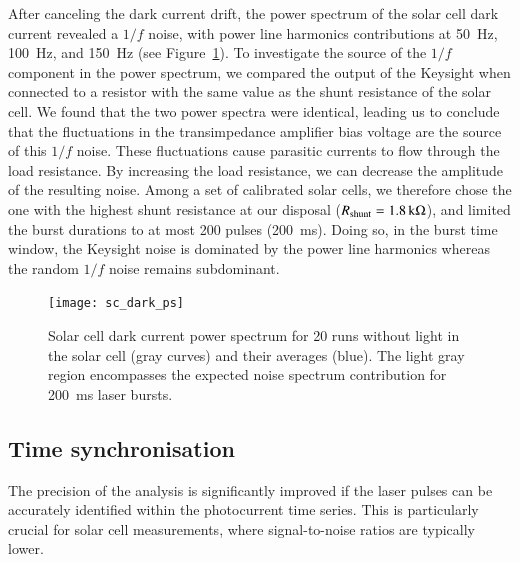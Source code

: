 After canceling the dark current drift, the power spectrum of the solar cell dark current revealed a $1/f$ noise, with power line harmonics contributions at \SI{50}{\hertz}, \SI{100}{\hertz}, and \SI{150}{\hertz} (see Figure~\ref{fig:darkcurrentspectrum}). To investigate the source of the $1/f$ component in the power spectrum, we compared the output of the Keysight when connected to a resistor with the same value as the shunt resistance of the solar cell. We found that the two power spectra were identical, leading us to conclude that the fluctuations in the transimpedance amplifier bias voltage are the source of this $1/f$ noise. These fluctuations cause parasitic currents to flow through the load resistance. By increasing the load resistance, we can decrease the amplitude of the resulting noise. Among a set of calibrated solar cells, we therefore chose the one with the highest shunt resistance at our disposal ($R_{\rm shunt} = \SI{1.8}{\kilo\ohm}$), and limited the burst durations to at most 200 pulses (\SI{200}{\ms}). Doing so, in the burst time window, the Keysight noise is dominated by the power line harmonics whereas the random $1/f$ noise remains subdominant.

\begin{figure}[h]
\begin{center}
\texttt{[image: sc\_dark\_ps]}
\end{center}
\caption[]{Solar cell dark current power spectrum for 20 runs without light in the solar cell (gray curves) and their averages (blue). The light gray region encompasses the expected noise spectrum contribution for \SI{200}{\ms} laser bursts.}
\label{fig:darkcurrentspectrum}
\end{figure}

\FloatBarrier   

\subsection{Time synchronisation}
\label{sec:synchro}

The precision of the analysis is significantly improved if the laser pulses can be accurately identified within the photocurrent time series. This is particularly crucial for solar cell measurements, where signal-to-noise ratios are typically lower.

